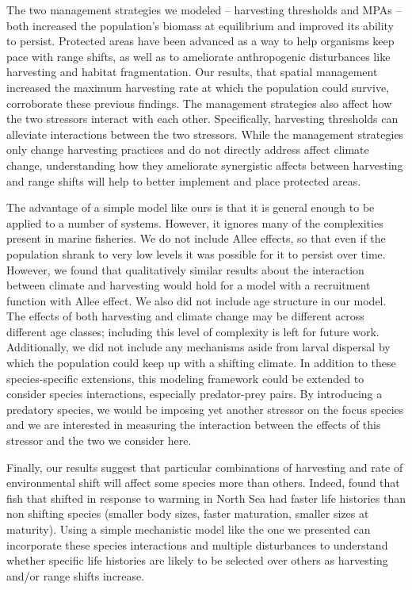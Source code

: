 \documentclass[12pt,english]{article}
\begin{document}
\begin{spacing}{1.9}
\begin{flushleft}
The two management strategies we modeled -- harvesting thresholds and MPAs -- both increased the population's biomass at equilibrium and improved its ability to persist.  Protected areas have been advanced as a way to help organisms keep pace with range shifts, as well as to ameliorate anthropogenic disturbances like harvesting and habitat fragmentation\citep{Lawleretal2010, Hannahetal2007,Botsfordetal2001, Gaylordetal2005, HastingsBotsford2003,Thomasetal2012}.  Our results, that spatial management increased the maximum harvesting rate at which the population could survive, corroborate these previous findings.  The management strategies also affect how the two stressors interact with each other.  Specifically, harvesting thresholds can alleviate interactions between the two stressors.   While the management strategies only change harvesting practices and do not directly address affect climate change, understanding how they ameliorate synergistic affects between harvesting and range shifts will help to better implement and place protected areas.

The advantage of a simple model like ours is that it is general enough to be applied to a number of systems.  However, it  ignores many of the complexities present in marine fisheries. We do not include Allee effects, so that even if the population shrank to very low levels it was possible for it to persist over time. However, we found that qualitatively similar results about the interaction between climate and harvesting would hold for a model with a recruitment function with Allee effect. We also did not include age structure in our model. The effects of both harvesting and climate change may be different across different age classes; including this level of complexity is left for future work. Additionally, we did not include any mechanisms aside from larval dispersal by which the population could keep up with a shifting climate.  In addition to these species-specific extensions, this modeling framework could be extended to consider species interactions, especially predator-prey pairs.  By introducing a predatory species, we would be imposing yet another stressor on the focus species \citep{Lingetal2009, Gurevitchetal2000}and we are interested in measuring the interaction between the effects of this stressor and the two we consider here.

Finally, our results suggest that particular combinations of harvesting and rate of environmental shift will affect some species more than others. Indeed, \citet{Perryetal2005} found that fish that shifted in response to warming in North Sea had faster life histories than non shifting species (smaller body sizes, faster maturation, smaller sizes at maturity). Using a simple mechanistic model like the one we presented can incorporate these species interactions and multiple disturbances to understand whether specific life histories are likely to be selected over others as harvesting and/or range shifts increase.


\end{flushleft}
\end{spacing}
\end{document}
